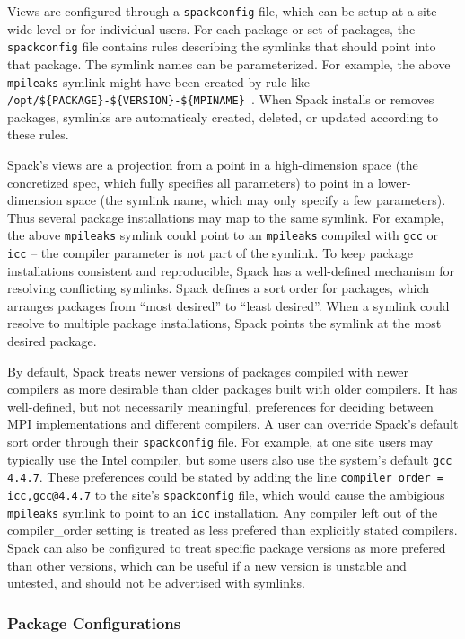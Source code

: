 Views are configured through a {\tt spackconfig} file, which can be setup at a site-wide level or for individual users.
For each package or set of packages, the {\tt spackconfig} file contains rules
describing the symlinks that should point into that package.
The symlink names can be parameterized.
For example, the above {\tt mpileaks} symlink might have been created by rule like
{\tt /opt/\$\{PACKAGE\}-\$\{VERSION\}-\$\{MPINAME\} }.
When Spack installs or removes packages,
symlinks are automaticaly created, deleted, or updated according to these rules.  

Spack's views are a projection from a point in a high-dimension space
(the concretized spec, which fully specifies all parameters) to point in a lower-dimension space
(the symlink name, which may only specify a few parameters).
Thus several package installations may map to the same symlink.
For example, the above {\tt mpileaks} symlink could point to an {\tt mpileaks} compiled with
{\tt gcc} or {\tt icc} -- the compiler parameter is not part of the symlink.
To keep  package installations  consistent and reproducible,
Spack has a well-defined mechanism for resolving conflicting symlinks.
Spack defines a sort order for packages, which arranges packages from ``most desired'' to ``least desired''.
When a symlink could resolve to multiple package installations,
Spack points the symlink at the most desired package.  

By default, Spack treats newer versions of packages compiled with newer compilers
as more desirable than older packages built with older compilers.
It has well-defined, but not necessarily meaningful,
preferences for deciding between MPI implementations and different compilers.
A user can override Spack's default sort order through their {\tt spackconfig} file.
For example, at one site users may typically use the Intel compiler,
but some users also use the system's default {\tt gcc 4.4.7}.
These preferences could be stated by adding the line
{\tt compiler\_order = icc,gcc@4.4.7} to the site's {\tt spackconfig} file,
which would cause the ambigious {\tt mpileaks} symlink to point to an {\tt icc} installation.
Any compiler left out of the compiler\_order setting is treated as less prefered than explicitly stated compilers.
Spack can also be configured to treat specific package versions as more prefered than other versions,
which can be useful if a new version is unstable and untested, and should not be advertised with symlinks.  


\subsubsection{Package Configurations}


